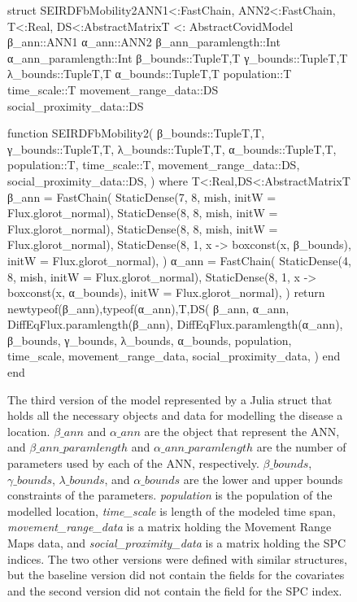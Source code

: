 \begin{figure}[!htb]
\centering
\begin{jllisting}
struct SEIRDFbMobility2{ANN1<:FastChain,
                        ANN2<:FastChain,
                        T<:Real,
                        DS<:AbstractMatrix{T}} <: AbstractCovidModel
    β_ann::ANN1
    α_ann::ANN2
    β_ann_paramlength::Int
    α_ann_paramlength::Int
    β_bounds::Tuple{T,T}
    γ_bounds::Tuple{T,T}
    λ_bounds::Tuple{T,T}
    α_bounds::Tuple{T,T}
    population::T
    time_scale::T
    movement_range_data::DS
    social_proximity_data::DS

    function SEIRDFbMobility2(
        β_bounds::Tuple{T,T},
        γ_bounds::Tuple{T,T},
        λ_bounds::Tuple{T,T},
        α_bounds::Tuple{T,T},
        population::T,
        time_scale::T,
        movement_range_data::DS,
        social_proximity_data::DS,
    ) where {T<:Real,DS<:AbstractMatrix{T}}
        β_ann = FastChain(
            StaticDense(7, 8, mish, initW = Flux.glorot_normal),
            StaticDense(8, 8, mish, initW = Flux.glorot_normal),
            StaticDense(8, 8, mish, initW = Flux.glorot_normal),
            StaticDense(8, 1,
                        x -> boxconst(x, β_bounds),
                        initW = Flux.glorot_normal),
        )
        α_ann = FastChain(
            StaticDense(4, 8, mish, initW = Flux.glorot_normal),
            StaticDense(8, 1,
                        x -> boxconst(x, α_bounds),
                        initW = Flux.glorot_normal),
        )
        return new{typeof(β_ann),typeof(α_ann),T,DS}(
            β_ann, α_ann,
            DiffEqFlux.paramlength(β_ann),
            DiffEqFlux.paramlength(α_ann),
            β_bounds, γ_bounds, λ_bounds, α_bounds, population,
            time_scale,
            movement_range_data,
            social_proximity_data,
        )
    end
end
\end{jllisting}
\caption[Julia implementation of a struct representing the model third version]{The third version of the model represented by a Julia struct that holds all the necessary objects and data for modelling the disease a location. \textit{$\beta\_ann$} and \textit{$\alpha\_ann$} are the object that represent the ANN, and \textit{$\beta\_ann\_paramlength$} and \textit{$\alpha\_ann\_paramlength$} are the number of parameters used by each of the ANN, respectively. \textit{$\beta\_bounds$}, \textit{$\gamma\_bounds$}, \textit{$\lambda\_bounds$}, and \textit{$\alpha\_bounds$} are the lower and upper bounds constraints of the parameters. \textit{population} is the population of the modelled location, \textit{time\_scale} is length of the modeled time span, \textit{movement\_range\_data} is a matrix holding the Movement Range Maps data, and \textit{social\_proximity\_data} is a matrix holding the SPC indices. The two other versions were defined with similar structures, but the baseline version did not contain the fields for the covariates and the second version did not contain the field for the SPC index.}
\label{fig:diffeq-seird-fb2-struct}
\end{figure}

